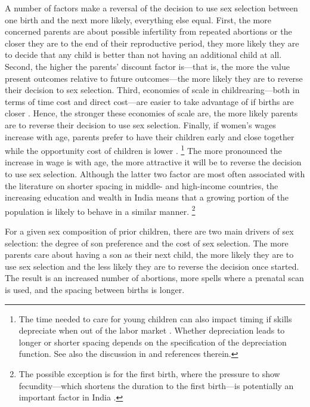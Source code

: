 \documentclass[12pt,letterpaper]{article}
\begin{document}
A number of factors make a reversal of the decision to use sex 
selection between one birth and the next more likely, 
everything else equal.
First, the more concerned parents are about possible infertility 
from repeated abortions or the closer they are to the end of their 
reproductive period, they more likely they are to decide that any 
child is better than not having an additional child at all.
Second, the higher the parents' discount factor is---that is, the
more the value present outcomes relative to future outcomes---the
more likely they are to reverse their decision to sex selection.
Third, economies of scale in childrearing---both in terms of time cost 
and direct cost---are easier to take advantage of if births 
are closer \citep[p 947]{Newman1984}.
Hence, the stronger these economies of scale are, the more likely
parents are to reverse their decision to use sex selection.
Finally, if women's wages increase with age, parents prefer
to have their children early and close together while 
the opportunity cost of children is lower \citep{Heckman1976}.%
\footnote{
The time needed to care for young children can also impact 
timing if skills depreciate when out of the labor market \citep{Happel1984}.
Whether depreciation leads to longer or shorter spacing depends
on the specification of the depreciation function.
See also the discussion in \citet[p 315]{Hotz1997}
and references therein.
}
The more pronounced the increase in wage is with age, the more 
attractive it will be to reverse the decision to use sex selection.
Although the latter two factor are most often associated with the literature
on shorter spacing in middle- and  high-income countries, 
the increasing education and wealth in India means that a growing 
portion of the population is likely to behave in a similar manner.%
\footnote{
The possible exception is for the first birth, where the pressure to show 
fecundity---which shortens the duration to the first birth---is potentially 
an important factor in India \citep{dyson83,Sethuraman2007,Dommaraju2009}.
}

For a given sex composition of prior children, there are two main drivers 
of sex selection: the degree of son preference and the cost of sex selection.
The more parents care about having a son as their next child, the more
likely they are to use sex selection and the less likely they are to
reverse the decision once started.
The result is an increased number of abortions, more spells where a
prenatal scan is used, and the spacing between births is longer.
\end{document}
